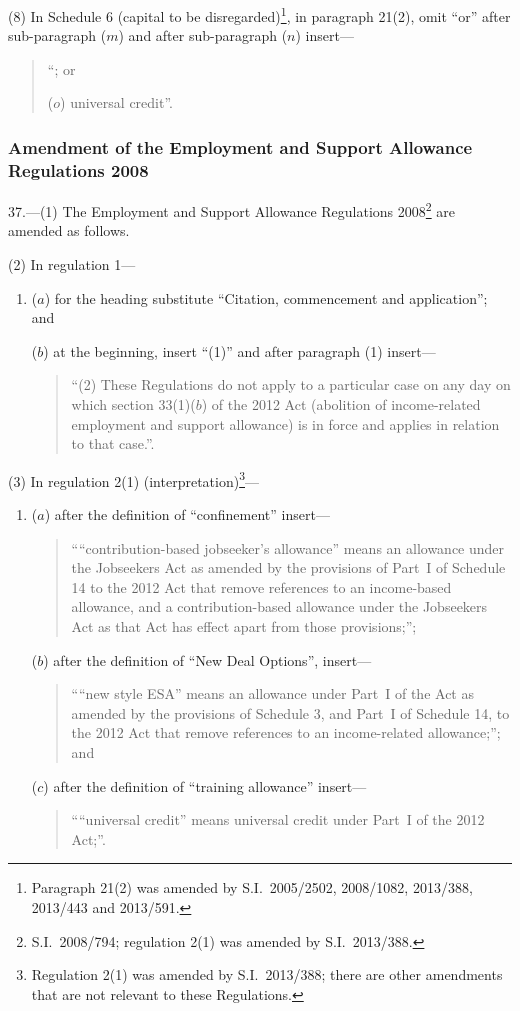\documentclass[12pt,a4paper]{article}
\begin{document}
(8) In Schedule 6 (capital to be disregarded)\footnote{Paragraph 21(2) was amended by S.I.~2005/2502, 2008/1082, 2013/388, 2013/443 and 2013/591.}, in paragraph 21(2), omit “or” after sub-paragraph ($m$)  and after sub-paragraph ($n$)  insert—
\begin{quotation}
“; or

($o$) universal credit”.
\end{quotation}

\subsubsection[37. Amendment of the Employment and Support Allowance Regulations 2008]{Amendment of the Employment and Support Allowance Regulations 2008}

37.—(1) The Employment and Support Allowance Regulations 2008\footnote{S.I.~2008/794; regulation 2(1) was amended by S.I.~2013/388.} are amended as follows.

(2) In regulation 1—
\begin{enumerate}\item[]
($a$) for the heading substitute “Citation, commencement and application”; and

($b$) at the beginning, insert “(1)” and after paragraph (1) insert—
\begin{quotation}
“(2) These Regulations do not apply to a particular case on any day on which section 33(1)($b$)  of the 2012 Act (abolition of income-related employment and support allowance) is in force and applies in relation to that case.”.
\end{quotation}
\end{enumerate}

(3) In regulation 2(1) (interpretation)\footnote{Regulation 2(1) was amended by S.I.~2013/388; there are other amendments that are not relevant to these Regulations.}—
\begin{enumerate}\item[]
($a$) after the definition of “confinement” insert—
\begin{quotation}
““contribution-based jobseeker’s allowance” means an allowance under the Jobseekers Act as amended by the provisions of Part~I of Schedule 14 to the 2012 Act that remove references to an income-based allowance, and a contribution-based allowance under the Jobseekers Act as that Act has effect apart from those provisions;”;
\end{quotation}

($b$) after the definition of “New Deal Options”, insert—
\begin{quotation}
““new style ESA” means an allowance under Part~I of the Act as amended by the provisions of Schedule 3, and Part~I of Schedule 14, to the 2012 Act that remove references to an income-related allowance;”; and
\end{quotation}

($c$) after the definition of “training allowance” insert—
\begin{quotation}
““universal credit” means universal credit under Part~I of the 2012 Act;”.
\end{quotation}
\end{enumerate}
\end{document}

